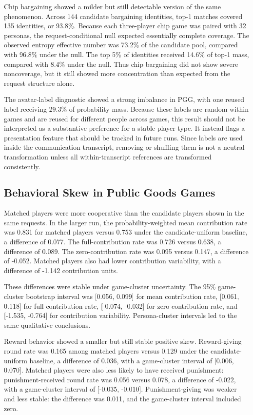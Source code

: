 \documentclass[11pt]{article}
\begin{document}
Chip bargaining showed a milder but still detectable version of the same phenomenon. Across 144 candidate bargaining identities, top-1 matches covered 135 identities, or 93.8\%. Because each three-player chip game was paired with 32 personas, the request-conditional null expected essentially complete coverage. The observed entropy effective number was 73.2\% of the candidate pool, compared with 96.8\% under the null. The top 5\% of identities received 14.6\% of top-1 mass, compared with 8.4\% under the null. Thus chip bargaining did not show severe noncoverage, but it still showed more concentration than expected from the request structure alone.

The avatar-label diagnostic showed a strong imbalance in PGG, with one reused label receiving 29.3\% of probability mass. Because these labels are random within games and are reused for different people across games, this result should not be interpreted as a substantive preference for a stable player type. It instead flags a presentation feature that should be tracked in future runs. Since labels are used inside the communication transcript, removing or shuffling them is not a neutral transformation unless all within-transcript references are transformed consistently.

\subsection{Behavioral Skew in Public Goods Games}

Matched players were more cooperative than the candidate players shown in the same requests. In the larger run, the probability-weighted mean contribution rate was 0.831 for matched players versus 0.753 under the candidate-uniform baseline, a difference of 0.077. The full-contribution rate was 0.726 versus 0.638, a difference of 0.089. The zero-contribution rate was 0.095 versus 0.147, a difference of -0.052. Matched players also had lower contribution variability, with a difference of -1.142 contribution units.

These differences were stable under game-cluster uncertainty. The 95\% game-cluster bootstrap interval was [0.056, 0.099] for mean contribution rate, [0.061, 0.118] for full-contribution rate, [-0.074, -0.032] for zero-contribution rate, and [-1.535, -0.764] for contribution variability. Persona-cluster intervals led to the same qualitative conclusions.

Reward behavior showed a smaller but still stable positive skew. Reward-giving round rate was 0.165 among matched players versus 0.129 under the candidate-uniform baseline, a difference of 0.036, with a game-cluster interval of [0.006, 0.070]. Matched players were also less likely to have received punishment: punishment-received round rate was 0.056 versus 0.078, a difference of -0.022, with a game-cluster interval of [-0.035, -0.010]. Punishment-giving was weaker and less stable: the difference was 0.011, and the game-cluster interval included zero.
\end{document}
